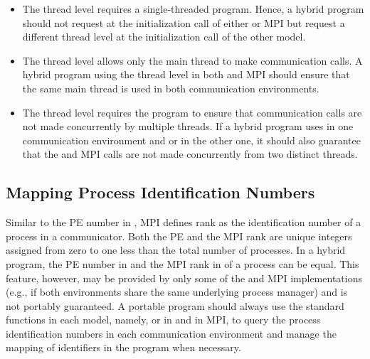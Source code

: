 \begin{itemize}
    \item The  thread level requires a single-threaded program.
    Hence, a hybrid program should not request  at the initialization
    call of either \openshmem or \ac{MPI} but request a different thread level at the
    initialization call of the other model.

    \item The  thread level allows only the main thread to
    make communication calls. A hybrid program using the 
    thread level in both \openshmem and \ac{MPI} should ensure that the same main thread
    is used in both communication environments.

    \item The  thread level requires the program to ensure
    that communication calls are not made concurrently by multiple threads. If a
    hybrid program uses  in one communication environment
    and  or  in the other one, it
    should also guarantee that the \openshmem and \ac{MPI} calls are not made concurrently
    from two distinct threads.
\end{itemize}

\subsection{Mapping Process Identification Numbers}
\label{subsec:interoperability:id}

Similar to the \ac{PE} number in \openshmem, \ac{MPI} defines rank as the
identification number of a process in a communicator. Both the \openshmem \ac{PE}
and the \ac{MPI} rank are unique integers assigned from zero to one less than the total
number of processes. In a hybrid program, the \openshmem
\ac{PE} number in 
and the \ac{MPI} rank in  of a process can be equal.
This feature, however, may be provided by only some of the \openshmem and \ac{MPI}
implementations (e.g., if both environments share the same underlying process
manager) and is not portably guaranteed. A portable program should always
use the standard functions in each model, namely,  or  in \openshmem 
and  in \ac{MPI}, to query the process identification numbers
in each communication environment and manage the mapping of identifiers in the
program when necessary.

